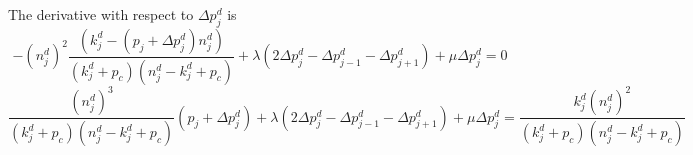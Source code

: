 \documentclass[aps,rmp, onecolumn]{revtex4}
\begin{document}
The derivative with respect to $\Delta p^d_j$ is
\begin{equation}
    -(n^d_j)^2\frac{(k^d_j - (p_j + \Delta p^d_j) n^d_j)}{(k^d_j+p_c)(n^d_j-k^d_j+p_c)}  + \lambda (2\Delta p^d_j - \Delta p^d_{j-1}- \Delta p^d_{j+1}) + \mu \Delta p_j^d = 0
\end{equation}
\begin{equation}
    \frac{(n^d_j)^3}{(k^d_j+p_c)(n^d_j-k^d_j+p_c)}(p_j + \Delta p^d_j)   + \lambda (2\Delta p^d_j - \Delta p^d_{j-1}- \Delta p^d_{j+1}) + \mu \Delta p_j^d = \frac{k^d_j(n^d_j)^2}{(k^d_j+p_c)(n^d_j-k^d_j+p_c)}
\end{equation}
\end{document}
